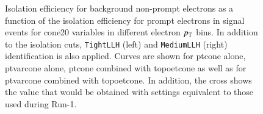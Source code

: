 \begin{figure}[phtb!]
\begin{center}
\end{center}
\vspace{-0.2cm}
\caption{Isolation efficiency for background non-prompt electrons as a function of the isolation efficiency for prompt electrons in signal events for cone20 variables in different electron $p_{\mathrm{T}}$ bins. In addition to the isolation cuts, {\tt TightLLH} (left) and {\tt MediumLLH} (right) identification is also applied. Curves are shown for ptcone alone, ptvarcone alone, ptcone combined with topoetcone as well as for ptvarcone combined with topoetcone. In addition, the cross shows the value that would be obtained with settings equivalent to those used during Run-1.}
\label{fig:isoEl2}
\end{figure}

